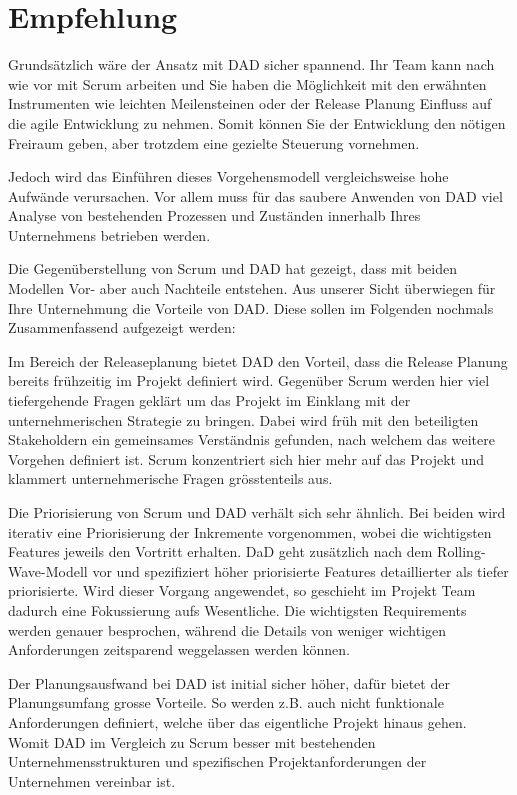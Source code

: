 \chapter{Empfehlung}


Grundsätzlich wäre der Ansatz mit DAD sicher spannend. Ihr Team kann nach wie vor mit Scrum arbeiten und Sie haben die Möglichkeit mit den erwähnten Instrumenten wie leichten Meilensteinen oder der Release Planung Einfluss auf die agile Entwicklung zu nehmen. Somit können Sie der Entwicklung den nötigen Freiraum geben, aber trotzdem eine gezielte Steuerung vornehmen.

Jedoch wird das Einführen dieses Vorgehensmodell vergleichsweise hohe Aufwände verursachen. Vor allem muss für das saubere Anwenden von DAD viel Analyse von bestehenden Prozessen und Zuständen innerhalb Ihres Unternehmens betrieben werden.

Die Gegenüberstellung von Scrum und DAD hat gezeigt, dass mit beiden Modellen Vor- aber auch Nachteile entstehen. Aus unserer Sicht überwiegen für Ihre Unternehmung die Vorteile von DAD. Diese sollen im Folgenden nochmals Zusammenfassend aufgezeigt werden:

Im Bereich der Releaseplanung bietet DAD den Vorteil, dass die Release Planung bereits frühzeitig im Projekt definiert wird. Gegenüber Scrum werden hier viel tiefergehende Fragen geklärt um das Projekt im Einklang mit der unternehmerischen Strategie zu bringen. Dabei wird früh mit den beteiligten Stakeholdern ein gemeinsames Verständnis gefunden, nach welchem das weitere Vorgehen definiert ist. Scrum konzentriert sich hier mehr auf das Projekt und klammert unternehmerische Fragen grösstenteils aus.

Die Priorisierung von Scrum und DAD verhält sich sehr ähnlich. Bei beiden wird iterativ eine Priorisierung der Inkremente vorgenommen, wobei die wichtigsten Features jeweils den Vortritt erhalten. DaD geht zusätzlich nach dem Rolling-Wave-Modell vor und spezifiziert höher priorisierte Features detaillierter als tiefer priorisierte. Wird dieser Vorgang angewendet, so geschieht im Projekt Team dadurch eine Fokussierung aufs Wesentliche. Die wichtigsten Requirements werden genauer besprochen, während die Details von weniger wichtigen Anforderungen zeitsparend weggelassen werden können.

Der Planungsausfwand bei DAD ist initial sicher höher, dafür bietet der Planungsumfang grosse Vorteile. So werden z.B. auch nicht funktionale Anforderungen definiert, welche über das eigentliche Projekt hinaus gehen. Womit DAD im Vergleich zu Scrum besser mit bestehenden Unternehmensstrukturen und spezifischen Projektanforderungen der Unternehmen vereinbar ist.

